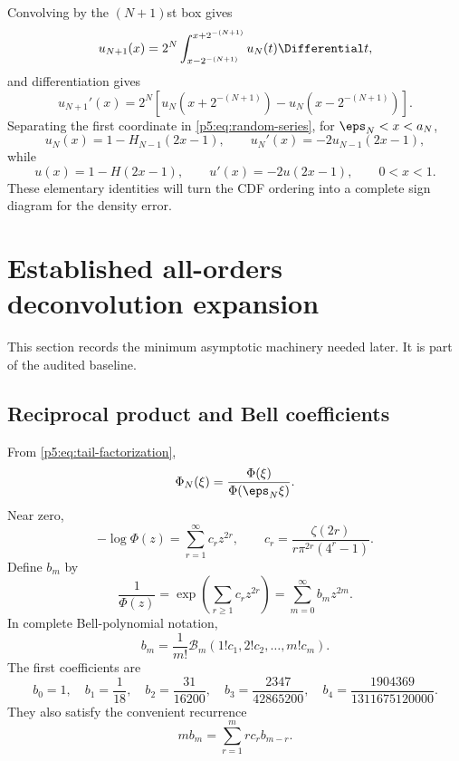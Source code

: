 \documentclass[11pt,oneside]{article}
\numberwithin{equation}{section}
\theoremstyle{definition}
\theoremstyle{remark}
\begin{document}
Convolving by the $(N+1)$st box gives
\begin{equation}
 u_{N+1}(x)=2^N\int_{x-2^{-(N+1)}}^{x+2^{-(N+1)}}u_N(t)\Differential t,
 \label{p5:eq:averaging}
\end{equation}
and differentiation gives
\begin{equation}
 u_{N+1}'(x)=2^N\left[
 u_N\!\left(x+2^{-(N+1)}\right)
 -u_N\!\left(x-2^{-(N+1)}\right)
 \right].
 \label{p5:eq:derivative-rec}
\end{equation}
Separating the first coordinate in \eqref{p5:eq:random-series}, for $\eps_N<x<a_N$,
\begin{equation}
 u_N(x)=1-H_{N-1}(2x-1),
 \qquad
 u_N'(x)=-2u_{N-1}(2x-1),
 \label{p5:eq:first-coordinate-finite}
\end{equation}
while
\begin{equation}
 u(x)=1-H(2x-1),
 \qquad
 u'(x)=-2u(2x-1),
 \qquad 0<x<1.
 \label{p5:eq:first-coordinate-limit}
\end{equation}
These elementary identities will turn the CDF ordering into a complete sign diagram for the density error.

\section{Established all-orders deconvolution expansion}
\label{p5:sec:allorders}

This section records the minimum asymptotic machinery needed later.  It is part of the audited baseline.

\subsection{Reciprocal product and Bell coefficients}

From \eqref{p5:eq:tail-factorization},
\begin{equation}
 \Phi_N(\xi)=\frac{\Phi(\xi)}{\Phi(\eps_N\xi)}.
 \label{p5:eq:deconvolution-quotient}
\end{equation}
Near zero,
\begin{equation}
 -\log\Phi(z)=\sum_{r=1}^{\infty}c_rz^{2r},
 \qquad
 c_r=\frac{\zeta(2r)}{r\pi^{2r}(4^r-1)}.
 \label{p5:eq:logphi}
\end{equation}
Define $b_m$ by
\begin{equation}
 \frac1{\Phi(z)}=\exp\!\left(\sum_{r\ge1}c_rz^{2r}\right)
 =\sum_{m=0}^{\infty}b_mz^{2m}.
 \label{p5:eq:bmdef}
\end{equation}
In complete Bell-polynomial notation,
\begin{equation}
 b_m=\frac1{m!}\mathcal B_m(1!c_1,2!c_2,\ldots,m!c_m).
 \label{p5:eq:bell-bm}
\end{equation}
The first coefficients are
\begin{equation}
 b_0=1,
 \quad b_1=\frac1{18},
 \quad b_2=\frac{31}{16200},
 \quad b_3=\frac{2347}{42865200},
 \quad b_4=\frac{1904369}{1311675120000}.
 \label{p5:eq:first-b}
\end{equation}
They also satisfy the convenient recurrence
\begin{equation}
 mb_m=\sum_{r=1}^{m}r c_r b_{m-r}.
 \label{p5:eq:b-rec}
\end{equation}
\end{document}
